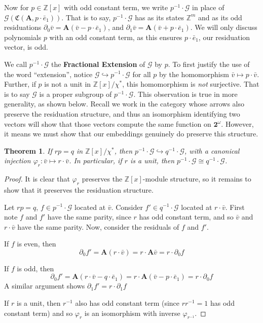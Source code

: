 \documentclass[final]{ws-ijac}
\newcommand{\G}{\mathcal{G}}
\newcommand{\Z}{\mathbb{Z}}
\newcommand{\2}{\textbf{2}}
\newcommand{\Am}{\textbf{A}}
\newcommand{\del}{\partial}
\newcommand{\vv}{\bar{v}}
\newcommand{\e}{\bar{e}}
\newtheorem{thm}{Theorem}
\begin{document}
Now for $p \in \Z[x]$ with odd constant term, we write
$p^{-1} \cdot \G$ in place of $\G(\mathfrak{C}(\Am, p \cdot \e_1))$.
That is to say, $p^{-1} \cdot \G$ has as its states $\Z^m$ and as its 
odd residuations
$\del_0 \vv = \Am (\vv - p \cdot \e_1)$, and 
$\del_1 \vv = \Am (\vv + p \cdot \e_1)$.
We will only discuss polynomials $p$ with an odd constant term, as 
this ensures $p \cdot \e_1$, our residuation vector, is odd.

We call $p^{-1} \cdot \G$ the \textbf{Fractional Extension} of $\G$ by $p$.
To first justify the use of the word ``extension'', notice 
$\G \hookrightarrow p^{-1} \cdot \G$ for all $p$ by the
homomorphism $\vv \mapsto p \cdot \vv$. 
Further, if $p$ is not a unit in $\Z[x] / \chi^*$, this 
homomorphism is \emph{not} surjective. That is to say $\G$ is a proper 
subgroup of $p^{-1} \cdot \G$.
This observation is true in more generality, as shown below.
Recall we work in the category whose arrows also preserve the residuation
structure, and thus an isomorphism identifying two vectors will show that
those vectors compute the same function on $\2^\omega$. However, it means
we must show that our embeddings genuinely do preserve this structure.

\begin{thm}
  If $rp = q$ in $\Z[x] / \chi^*$, then 
  $p^{-1} \cdot \G \hookrightarrow q^{-1} \cdot \G$, 
  with a canonical injection $\varphi_r : \vv \mapsto r \cdot \vv$. 
  In particular, if $r$ is a unit, then $p^{-1} \cdot \G \cong q^{-1} \cdot \G$.
\end{thm}

\begin{proof}
  It is clear that $\varphi_r$ preserves the $\Z[x]$-module structure, so
  it remains to show that it preserves the residuation structure.

  Let $rp = q$, $f \in p^{-1} \cdot \G$ located at $\vv$. 
  Consider $f' \in q^{-1} \cdot \G$ located at $r \cdot \vv$.
  First note $f$ and $f'$ have the same parity, since 
  $r$ has odd constant term, and so $\vv$ and $r \cdot \vv$
  have the same parity. Now, consider the residuals of $f$ and $f'$. 
  
  If $f$ is even, then 
  \[ \del_0 f' = \Am (r \cdot \vv) = r \cdot \Am \vv = r \cdot \del_0 f \]

  If $f$ is odd, then
  \[ \del_0 f' = \Am (r \cdot \vv - q \cdot \e_1) 
               = r \cdot \Am (\vv - p \cdot \e_1)
               = r \cdot \del_0 f \]
  A similar argument shows $\del_1 f' = r \cdot \del_1 f$

  If $r$ is a unit, then $r^{-1}$ also has odd constant term 
  (since $r r^{-1} = 1$ has odd constant term) and so $\varphi_r$
  is an isomorphism with inverse $\varphi_{r^{-1}}$.
\end{proof}
\end{document}
